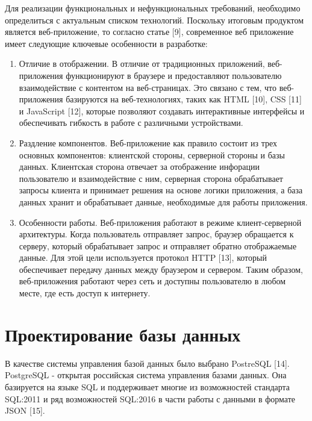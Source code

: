 \documentclass[a4paper,14pt,oneside]{extreport}
\begin{document}
Для реализации функциональных и нефункциональных требований, необходимо определиться с актуальным списком технологий. Поскольку итоговым продуктом является веб-приложение, то согласно статье [9], современное веб приложение имеет следующие ключевые особенности в разработке:
\begin{enumerate}

\item Отличие в отображении. В отличие от традиционных приложений, веб-приложения функционируют в браузере и предоставляют пользователю взаимодействие с контентом на веб-страницах. Это связано с тем, что веб-приложения базируются на веб-технологиях, таких как HTML [10], CSS [11] и JavaScript [12], которые позволяют создавать интерактивные интерфейсы и обеспечивать гибкость в работе с различными устройствами.

\item Раздление компонентов. Веб-приложение как правило состоит из трех основных компонентов: клиентской стороны, серверной стороны и базы данных. Клиентская сторона отвечает за отображение инфорации пользователю и взаимодействие с ним, серверная сторона обрабатывает запросы клиента и принимает решения на основе логики приложения, а база данных хранит и обрабатывает данные, необходимые для работы приложения.

\item Особенности работы. Веб-приложения работают в режиме клиент-серверной архитектуры. Когда пользователь отправляет запрос, браузер обращается к серверу, который обрабатывает запрос и отправляет обратно отображаемые данные. Для этой цели используется протокол HTTP [13], который обеспечивает передачу данных между браузером и сервером. Таким образом, веб-приложения работают через сеть и доступны пользователю в любом месте, где есть доступ к интернету.
\end{enumerate}


\section{Проектирование базы данных}

В качестве системы управления базой данных было выбрано PostreSQL [14]. PostgreSQL - открытая российская система управления базами данных. Она базируется на языке SQL и поддерживает многие из возможностей стандарта SQL:2011 и ряд возможностей SQL:2016 в части работы с данными в формате JSON [15].
\end{document}
